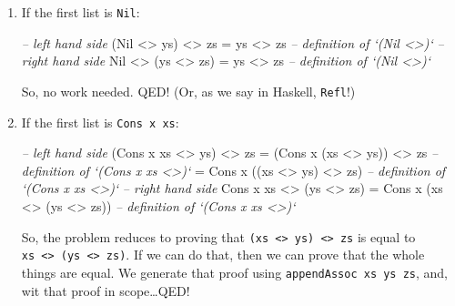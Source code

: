 \documentclass[]{article}
\newenvironment{Shaded}{}{}
\newcommand{\CommentTok}[1]{\textcolor[rgb]{0.38,0.63,0.69}{\textit{#1}}}
\newcommand{\DataTypeTok}[1]{\textcolor[rgb]{0.56,0.13,0.00}{#1}}
\newcommand{\FunctionTok}[1]{\textcolor[rgb]{0.02,0.16,0.49}{#1}}
\newcommand{\NormalTok}[1]{#1}
\begin{document}
\begin{enumerate}
\def\labelenumi{\arabic{enumi}.}
\item
  If the first list is \texttt{Nil}:

\begin{Shaded}
\begin{Highlighting}[]
\CommentTok{-- left hand side}
\NormalTok{(}\DataTypeTok{Nil} \FunctionTok{<>}\NormalTok{ ys) }\FunctionTok{<>}\NormalTok{ zs}
  \FunctionTok{=}\NormalTok{ ys }\FunctionTok{<>}\NormalTok{ zs        }\CommentTok{-- definition of `(Nil <>)`}
\CommentTok{-- right hand side}
\DataTypeTok{Nil} \FunctionTok{<>}\NormalTok{ (ys }\FunctionTok{<>}\NormalTok{ zs)}
  \FunctionTok{=}\NormalTok{ ys }\FunctionTok{<>}\NormalTok{ zs        }\CommentTok{-- definition of `(Nil <>)`}
\end{Highlighting}
\end{Shaded}

  So, no work needed. QED! (Or, as we say in Haskell, \texttt{Refl}!)
\item
  If the first list is \texttt{Cons\ x\ xs}:

\begin{Shaded}
\begin{Highlighting}[]
\CommentTok{-- left hand side}
\NormalTok{(}\DataTypeTok{Cons}\NormalTok{ x xs }\FunctionTok{<>}\NormalTok{ ys) }\FunctionTok{<>}\NormalTok{ zs}
  \FunctionTok{=}\NormalTok{ (}\DataTypeTok{Cons}\NormalTok{ x (xs }\FunctionTok{<>}\NormalTok{ ys)) }\FunctionTok{<>}\NormalTok{ zs   }\CommentTok{-- definition of `(Cons x xs <>)`}
  \FunctionTok{=} \DataTypeTok{Cons}\NormalTok{ x ((xs }\FunctionTok{<>}\NormalTok{ ys) }\FunctionTok{<>}\NormalTok{ zs)   }\CommentTok{-- definition of `(Cons x xs <>)`}
\CommentTok{-- right hand side}
\DataTypeTok{Cons}\NormalTok{ x xs }\FunctionTok{<>}\NormalTok{ (ys }\FunctionTok{<>}\NormalTok{ zs)}
  \FunctionTok{=} \DataTypeTok{Cons}\NormalTok{ x (xs }\FunctionTok{<>}\NormalTok{ (ys }\FunctionTok{<>}\NormalTok{ zs))   }\CommentTok{-- definition of `(Cons x xs <>)`}
\end{Highlighting}
\end{Shaded}

  So, the problem reduces to proving that
  \texttt{(xs\ \textless{}\textgreater{}\ ys)\ \textless{}\textgreater{}\ zs} is
  equal to
  \texttt{xs\ \textless{}\textgreater{}\ (ys\ \textless{}\textgreater{}\ zs)}.
  If we can do that, then we can prove that the whole things are equal. We
  generate that proof using \texttt{appendAssoc\ xs\ ys\ zs}, and, wit that
  proof in scope\ldots{}QED!
\end{enumerate}
\end{document}
